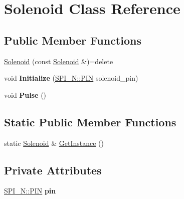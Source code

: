 \hypertarget{class_solenoid}{\section{Solenoid Class Reference}
\label{class_solenoid}
}
\subsection*{Public Member Functions}
\begin{DoxyCompactItemize}
\item 
\hyperlink{class_solenoid_a6e9f8ce2b5b09ea3f587b83dc7c7ee36}{Solenoid} (const \hyperlink{class_solenoid}{Solenoid} \&)=delete
\item 
\hypertarget{class_solenoid_ac1b0c6024b8120b8d1dfc446f454ce3b}{void {\bfseries Initialize} (\hyperlink{struct_s_p_i___n_1_1_p_i_n}{S\-P\-I\-\_\-\-N\-::\-P\-I\-N} solenoid\-\_\-pin)}\label{class_solenoid_ac1b0c6024b8120b8d1dfc446f454ce3b}

\item 
\hypertarget{class_solenoid_a50bc0121679bd1ff11323f1c88fe2ec6}{void {\bfseries Pulse} ()}\label{class_solenoid_a50bc0121679bd1ff11323f1c88fe2ec6}

\end{DoxyCompactItemize}
\subsection*{Static Public Member Functions}
\begin{DoxyCompactItemize}
\item 
static \hyperlink{class_solenoid}{Solenoid} \& \hyperlink{class_solenoid_adc5bf799e0eb382eb6a5e4d471308f20}{Get\-Instance} ()
\end{DoxyCompactItemize}
\subsection*{Private Attributes}
\begin{DoxyCompactItemize}
\item 
\hypertarget{class_solenoid_a1a6fef2de8c051a885472b6302cc5f7c}{\hyperlink{struct_s_p_i___n_1_1_p_i_n}{S\-P\-I\-\_\-\-N\-::\-P\-I\-N} {\bfseries pin}}\label{class_solenoid_a1a6fef2de8c051a885472b6302cc5f7c}

\end{DoxyCompactItemize}


